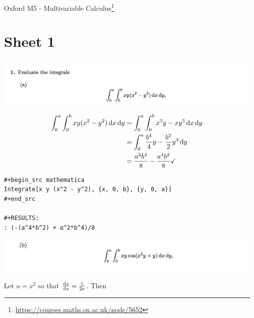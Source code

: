 \newpage


Oxford M5 - Multivariable Calculus\footnote{\url{https://courses.maths.ox.ac.uk/node/5652}}


\section{Sheet 1}

\subsection{}
\begin{mdframed}
  \includegraphics[width=400pt]{img/oxford-prelims-M5-multivariable-calc-1-1-a.png}
\end{mdframed}

\begin{align*}
  \int_0^a\int_0^b xy(x^2 - y^2)\dx\dy
  &= \int_0^a\int_0^b x^3y - xy^3\dx\dy\\
  &= \int_0^a\frac{b^4}{4}y - \frac{b^2}{2}y^3\dy\\
  &= \frac{a^2b^4}{8} - \frac{a^4b^2}{8} \checkmark
\end{align*}

\begin{verbatim}
#+begin_src mathematica
Integrate[x y (x^2 - y^2), {x, 0, b}, {y, 0, a}]
#+end_src

#+RESULTS:
: (-(a^4*b^2) + a^2*b^4)/8

\end{verbatim}


\newpage
\begin{mdframed}
  \includegraphics[width=400pt]{img/oxford-prelims-M5-multivariable-calc-1-1-b.png}
\end{mdframed}

Let $u = x^2$ so that $\dxdu = \frac{1}{2x}$. Then

